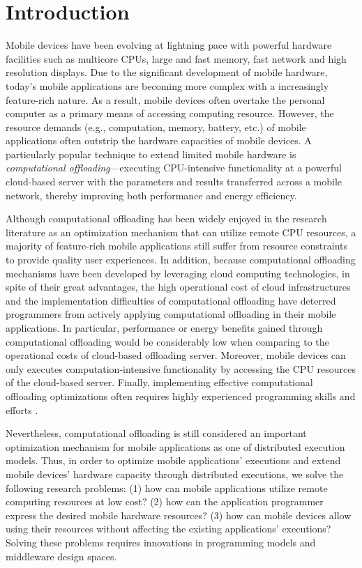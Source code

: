 \documentclass{sig-alternate}[10pt]
\begin{document}

\printccsdesc
{}

\section{Introduction}
Mobile devices have been evolving at lightning pace with powerful hardware facilities such as multicore CPUs, large and fast memory, fast network and high resolution displays. Due to the significant development of mobile hardware, today's mobile applications are becoming more complex with a increasingly feature-rich nature. As a result, mobile devices often overtake the personal computer as a primary means of accessing computing resource. However, the resource demands (e.g., computation, memory, battery, etc.) of mobile applications often outstrip the hardware capacities of mobile devices. A particularly popular technique to extend limited mobile hardware is \emph{computational offloading}---executing CPU-intensive functionality at a powerful cloud-based server with the parameters and results transferred across a mobile network, thereby improving both performance and energy efficiency. 

Although computational offloading has been widely enjoyed in the research literature as an optimization mechanism that can utilize remote CPU resources, a majority of feature-rich mobile applications still suffer from resource constraints to provide quality user experiences. In addition, because computational offloading mechanisms have been developed by leveraging cloud computing technologies, in spite of their great advantages, the high operational cost of cloud infrastructures and the implementation difficulties of computational offloading have deterred programmers from actively applying computational offloading in their mobile applications. In particular, performance or energy benefits gained through computational offloading would be considerably low when comparing to the operational costs of cloud-based offloading server. Moreover, mobile devices can only executes computation-intensive functionality by accessing the CPU resources of the cloud-based server. Finally, implementing effective computational offloading optimizations often requires highly experienced programming skills and efforts \cite{kwon+:mobilesoft15}.

Nevertheless, computational offloading is still considered an important optimization mechanism for mobile applications as one of distributed execution models. Thus, in order to optimize mobile applications' executions and extend mobile devices' hardware capacity through distributed executions, we solve the following research problems: (1) how can mobile applications utilize remote computing resources at low cost? (2) how can the application programmer express the desired mobile hardware resources? (3) how can mobile devices allow using their resources without affecting the existing applications' executions? Solving these problems requires innovations in programming models and middleware design spaces. 
\end{document}
